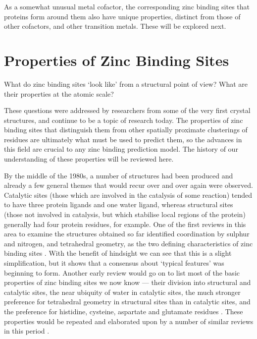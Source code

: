 As a somewhat unusual metal cofactor, the corresponding zinc binding sites that proteins form around them also have unique properties, distinct from those of other cofactors, and other transition metals. These will be explored next.

\section{Properties of Zinc Binding Sites}

What do zinc binding sites `look like' from a structural point of view? What are their properties at the atomic scale?

These questions were addressed by researchers from some of the very first crystal structures, and continue to be a topic of research today. The properties of zinc binding sites that distinguish them from other spatially proximate clusterings of residues are ultimately what must be used to predict them, so the advances in this field are crucial to any zinc binding prediction model. The history of our understanding of these properties will be reviewed here.

By the middle of the 1980s, a number of structures had been produced and already a few general themes that would recur over and over again were observed. Catalytic sites (those which are involved in the catalysis of some reaction) tended to have three protein ligands and one water ligand, whereas structural sites (those not involved in catalysis, but which stabilise local regions of the protein) generally had four protein residues, for example. One of the first reviews in this area to examine the structures obtained so far identified coordination by sulphur and nitrogen, and tetrahedral geometry, as the two defining characteristics of zinc binding sites \cite{williams1987biochemistry}. With the benefit of hindsight we can see that this is a slight simplification, but it shows that a consensus about `typical features' was beginning to form. Another early review would go on to list most of the basic properties of zinc binding sites we now know --- their division into structural and catalytic sites, the near ubiquity of water in catalytic sites, the much stronger preference for tetrahedral geometry in structural sites than in catalytic sites, and the preference for histidine, cysteine, aspartate and glutamate residues \cite{vallee1990zinc}. These properties would be repeated and elaborated upon by a number of similar reviews in this period \cite{tainer1991metal,vallee1992functional,coleman1992zinc}.

